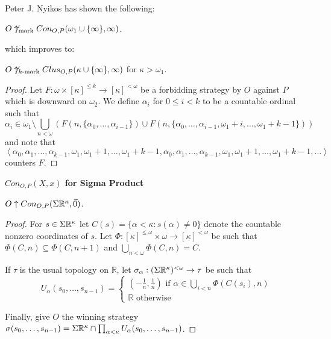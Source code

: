 Peter J. Nyikos has shown the following:

\begin{theorem}
$O\not\uparrow_{\text{mark}} Con_{O,P}(\omega_1\cup\{\infty\},\infty)$.
\end{theorem}

which improves to:

\begin{theorem}
$O\not\uparrow_{k\text{-mark}}Clus_{O,P}(\kappa\cup\{\infty\},\infty)$ for $\kappa>\omega_1$.
\end{theorem}

\begin{proof}
Let $F:\omega \times [\kappa]^{\leq k} \to [\kappa]^{<\omega}$ be a forbidding strategy by $O$ against $P$ which is downward on $\omega_2$. We define $\alpha_i$ for $0\leq i < k$ to be a countable ordinal such that \[ \alpha_i \in \omega_1 \setminus\bigcup_{n<\omega}\left(F(n,\{\alpha_0,\dots,\alpha_{i-1}\}) \cup F(n,\{\alpha_0,\dots,\alpha_{i-1},\omega_1+i,\dots,\omega_1+k-1\})\right)\] and note that \[\left<\alpha_0,\alpha_1,\dots,\alpha_{k-1},\omega_1,\omega_1+1,\dots,\omega_1+k-1,\alpha_0,\alpha_1,\dots,\alpha_{k-1},\omega_1,\omega_1+1,\dots,\omega_1+k-1,\dots\right>\] counters $F$.
\end{proof}

\centerline{\bf $Con_{O,P}(X,x)$ for Sigma Product}

\begin{proposition}
$O\uparrow Con_{O,P}(\Sigma\mathbb{R}^{\kappa},\vec{0})$.
\end{proposition}

\begin{proof}
For $s\in\Sigma\mathbb{R}^{\kappa}$ let $C(s)=\{\alpha<\kappa:s(\alpha)\not=0\}$ denote the countable nonzero coordinates of $s$. Let $\Phi:[\kappa]^{\leq\omega}\times\omega\to[\kappa]^{<\omega}$ be such that $\Phi(C,n)\subseteq\Phi(C,n+1)$ and $\bigcup_{n<\omega}\Phi(C,n)=C$.

If $\tau$ is the usual topology on $\mathbb{R}$, let $\sigma_\alpha:(\Sigma\mathbb{R}^{\kappa})^{<\omega}\to\tau$ be such that
\[
U_\alpha(s_0,\dots,s_{n-1})=\left\{
\begin{array}{l}
(-\frac{1}{n},\frac{1}{n}) \text{ if } \alpha\in\bigcup_{i<n}\Phi(C(s_i),n) \\
\mathbb{R} \text{ otherwise}
\end{array}
\right.
\]

Finally, give $O$ the winning strategy $\sigma(s_0,\dots,s_{n-1})=\Sigma\mathbb{R}^{\kappa}\cap\prod_{\alpha<\kappa}U_\alpha(s_0,\dots,s_{n-1})$.
\end{proof}

